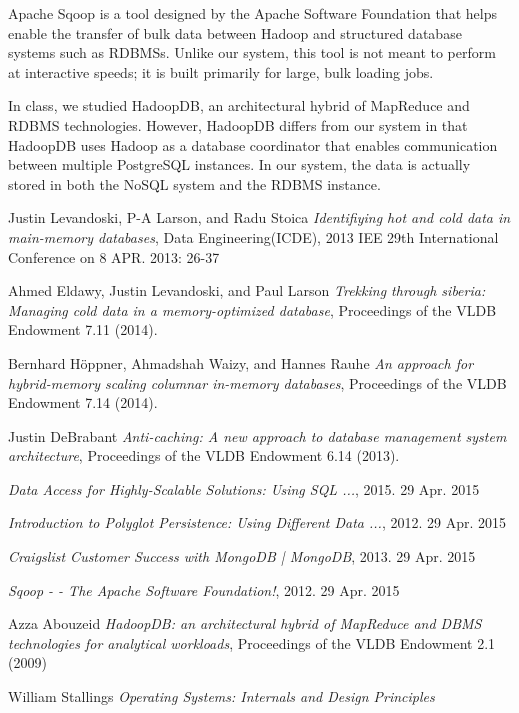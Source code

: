 \documentclass[12pt]{article}
\begin{document}
Apache Sqoop is a tool designed by the Apache Software Foundation that helps enable the transfer of bulk data between Hadoop and structured database systems such as RDBMSs\cite{8}. Unlike our system, this tool is not meant to perform at interactive speeds; it is built primarily for large, bulk loading jobs. 

In class, we studied HadoopDB, an architectural hybrid of MapReduce and RDBMS technologies\cite{9}. However, HadoopDB differs from our system in that HadoopDB uses Hadoop as a database coordinator that enables communication between multiple PostgreSQL instances. In our system, the data is actually stored in both the NoSQL system and the RDBMS instance. 


\begin{thebibliography}{9}

  Justin Levandoski, P-A Larson, and Radu Stoica
  \emph{Identifiying hot and cold data in main-memory databases},
  Data Engineering(ICDE), 2013 IEE 29th International Conference 
  on 8 APR. 2013: 26-37

  Ahmed Eldawy, Justin Levandoski, and Paul Larson
  \emph{Trekking through siberia: Managing cold data in a memory-optimized database}, Proceedings of the VLDB Endowment 7.11 (2014).

  Bernhard Höppner, Ahmadshah Waizy, and Hannes Rauhe
  \emph{An approach for hybrid-memory scaling columnar in-memory databases}, Proceedings of the VLDB Endowment 7.14 (2014).

  Justin DeBrabant
  \emph{Anti-caching: A new approach to database management system architecture}, Proceedings of the VLDB Endowment 6.14 (2013).

  \emph{Data Access for Highly-Scalable Solutions: Using SQL ...}, 2015. 29 Apr. 2015 

  \emph{Introduction to Polyglot Persistence: Using Different Data ...}, 2012. 29 Apr. 2015 

  \emph{Craigslist Customer Success with MongoDB | MongoDB}, 2013. 29 Apr. 2015 

  \emph{Sqoop - - The Apache Software Foundation!}, 2012. 29 Apr. 2015

  Azza Abouzeid
  \emph{HadoopDB: an architectural hybrid of MapReduce and DBMS technologies for analytical workloads}, Proceedings of the VLDB Endowment 2.1 (2009)

  William Stallings
  \emph{Operating Systems: Internals and Design Principles}

\end{thebibliography}
\end{document}

